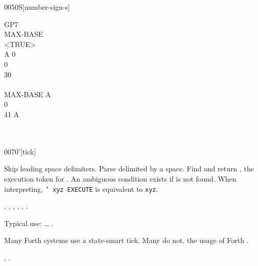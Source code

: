 \begin{worddef}[numS]{0050}{\num{}S}[number-sign-s]
\begin{testing}
		\word{:} GP7 \\
		\tab	{}  		MAX-BASE  \word{!} \\
		\tab	<TRUE> \\
		\tab	A 0  \\
		\tab[2]		 0    \\
		 \word{=}    30 \word{+} \word{=} \word{AND}  \\
		\tab	\word{LOOP} \\
		\tab	MAX-BASE A \word{DO} \\
		\tab[2]		 0   \word{num-end} \\
		 \word{=}   41  A \word{-} \word{+} \word{=}   \\
		\tab	{} \\
		\tab	{}  \word{!} \word{;} \\
	\end{testing}
\end{worddef}


\begin{worddef}{0070}{'}[tick]
\item {}

	Skip leading space delimiters. Parse  delimited by
	a space. Find  and return , the execution
	token for . An ambiguous condition exists if
	 is not found. When interpreting,
	\texttt{' xyz EXECUTE} is equivalent to \texttt{xyz}.

\see {},
	,
	,
	,
	,
	.

	\begin{rationale} %
		Typical use: {\ldots}  .

		Many Forth systems use a state-smart tick. Many do not.
		 the usage of Forth .

	\see {},
		.
	\end{rationale}

	\begin{testing} %
		 \\
	\end{testing}
\end{worddef}


